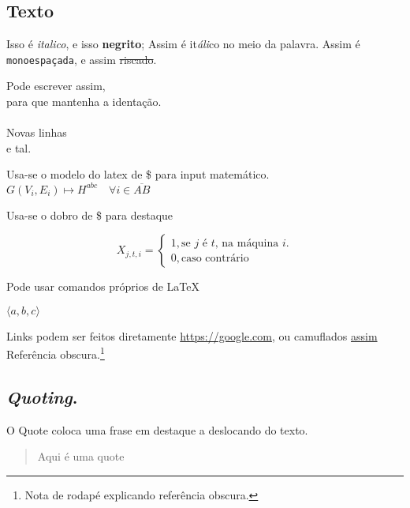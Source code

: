 \hypertarget{texto}{%
\subsection{Texto}\label{texto}}

Isso é \emph{italico}, e isso \textbf{negrito}; Assim é it\emph{áli}co
no meio da palavra. Assim é \texttt{monoespaçada}, e assim
\sout{riscado}.

Pode escrever assim,\\
\hspace*{0.333em}\hspace*{0.333em}\hspace*{0.333em}para que mantenha a
identação.\\
~\\
\hspace*{0.333em}\hspace*{0.333em}\hspace*{0.333em}Novas linhas\\
e tal.

Usa-se o modelo do latex de \$ para input matemático.\\
\(G(V_i, E_i) \mapsto H^{abc} \quad \forall i \in \overline{AB}\)

Usa-se o dobro de \$ para destaque

\[X_{j,t,i} = \begin{cases} 1, \text{se  $j$ é $t$, na máquina $i$}. \\ 0, \text{caso contrário} \end{cases}\]

Pode usar comandos próprios de \LaTeX

\newcommand{\tuple}[1]{\langle #1 \rangle}

\(\langle a, b, c \rangle\)

Links podem ser feitos diretamente \url{https://google.com}, ou
camuflados \href{https://google.com}{assim} Referência
obscura.\footnote{Nota de rodapé explicando referência obscura.}
\newpage

\hypertarget{quoting.}{%
\subsection{\texorpdfstring{\emph{Quoting}.}{Quoting.}}\label{quoting.}}

O Quote coloca uma frase em destaque a deslocando do texto.

\begin{quote}
Aqui é uma quote
\end{quote}

